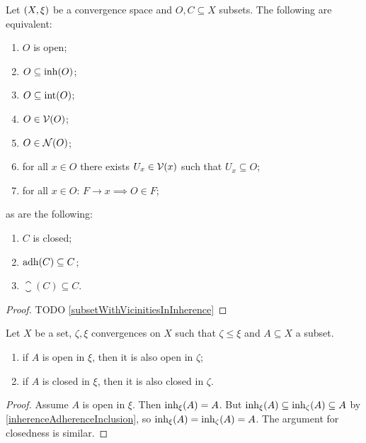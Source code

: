 \begin{lemma} \label{openClosedCriteria}
Let $\left( X,\xi \right)$ be a convergence space and $O,C\subseteq X$ subsets. The following are equivalent:
\begin{enumerate}
\item $O$ is open;
\item $O\subseteq \operatorname{inh}(O)$;
\item $O\subseteq \operatorname{int}(O)$;
\item $O\in \operatorname{\mathcal{V}}(O)$;
\item $O\in \operatorname{\mathcal{N}}(O)$;
\item for all $x\in O$ there exists $U_x\in \operatorname{\mathcal{V}}(x)$ such that $U_x\subseteq O$;
\item for all $x\in O$: $F\to x \implies O\in F$;
\end{enumerate}
as are the following:
\begin{enumerate}
\item $C$ is closed;
\item $\operatorname{adh}(C)\subseteq C$;
\item $\closure(C)\subseteq C$.
\end{enumerate}
\end{lemma}
\begin{proof}
TODO \ref{subsetWithVicinitiesInInherence}
\end{proof}

\begin{lemma}
Let $X$ be a set, $\zeta, \xi$ convergences on $X$ such that $\zeta\leq\xi$ and $A\subseteq X$ a subset.
\begin{enumerate}
\item if $A$ is open in $\xi$, then it is also open in $\zeta$;
\item if $A$ is closed in $\xi$, then it is also closed in $\zeta$.
\end{enumerate}
\end{lemma}
\begin{proof}
Assume $A$ is open in $\xi$. Then $\operatorname{inh}_\xi(A) = A$. But $\operatorname{inh}_\xi(A) \subseteq \operatorname{inh}_\zeta(A) \subseteq A$ by \ref{inherenceAdherenceInclusion}, so $\operatorname{inh}_\xi(A) = \operatorname{inh}_\zeta(A) = A$. The argument for closedness is similar.
\end{proof}


